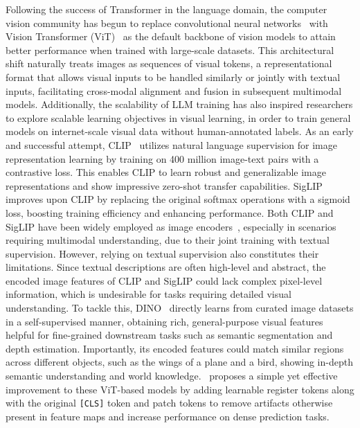 \documentclass[10pt, a4paper, logo, copyright]{googledeepmind} %
\begin{document}
Following the success of Transformer in the language domain, the computer vision community has begun to replace convolutional neural networks~\cite{lecun1989backpropagation,krizhevsky2012imagenet,he2016deep} with Vision Transformer (ViT)~\cite{dosovitskiy2020image} as the default backbone of vision models to attain better performance when trained with large-scale datasets. This architectural shift naturally treats images as sequences of visual tokens, a representational format that allows visual inputs to be handled similarly or jointly with textual inputs, facilitating cross-modal alignment and fusion in subsequent multimodal models. 
Additionally, the scalability of LLM training has also inspired researchers to explore scalable learning objectives in visual learning, in order to train general models on internet-scale visual data without human-annotated labels. As an early and successful attempt, CLIP~\cite{radford2021learning} utilizes natural language supervision for image representation learning by training on 400 million image-text pairs with a contrastive loss. This enables CLIP to learn robust and generalizable image representations and show impressive zero-shot transfer capabilities. SigLIP~\cite{zhai2023sigmoid} improves upon CLIP by replacing the original softmax operations with a sigmoid loss, boosting training efficiency and enhancing performance. Both CLIP and SigLIP have been widely employed as image encoders~\cite{liu2023visual,karamcheti2024prismatic}, especially in scenarios requiring multimodal understanding, due to their joint training with textual supervision. However, relying on textual supervision also constitutes their limitations. Since textual descriptions are often high-level and abstract, the encoded image features of CLIP and SigLIP could lack complex pixel-level information, which is undesirable for tasks requiring detailed visual understanding. To tackle this, DINO~\cite{caron2021emerging,oquab2023dinov2} directly learns from curated image datasets in a self-supervised manner, obtaining rich, general-purpose visual features helpful for fine-grained downstream tasks such as semantic segmentation and depth estimation. Importantly, its encoded features could match similar regions across different objects, such as the wings of a plane and a bird, showing in-depth semantic understanding and world knowledge.~\citet{darcet2024vision} proposes a simple yet effective improvement to these ViT-based models by adding learnable register tokens along with the original \texttt{[CLS]} token and patch tokens to remove artifacts otherwise present in feature maps and increase performance on dense prediction tasks.
\end{document}
